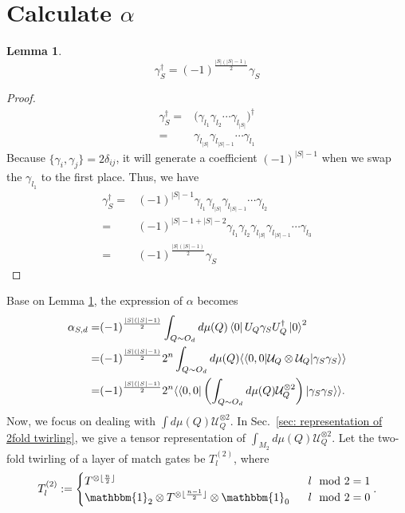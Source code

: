 \documentclass{article}
\newcommand{\pbra}[1]{\left( #1 \right)}
\newcommand{\supket}[1]{|#1 \rangle\rangle}
\newcommand{\supbra}[1]{\langle\langle #1 |}
\newtheorem{lemma}{Lemma}
\newcommand{\Ucal}{\mathcal{U}}
\newcommand{\id}{\mathbbm{1}}
\begin{document}
\section{Calculate $\alpha$}
\begin{lemma}
\label{lemma: gamma dagger}
    \begin{equation} 
        \gamma_S^\dagger = (-1)^{\frac{|S|(|S|-1)}{2}}\gamma_S
    \end{equation}
\end{lemma}
\begin{proof}
    \begin{align*}
        \gamma_S^\dagger =& \Big(
            \gamma_{l_1}\gamma_{l_2}\cdots \gamma_{l_{|S|}}
        \Big)^\dagger\\
        =& \gamma_{l_{|S|}}\gamma_{l_{|S|-1}}\cdots \gamma_{l_1}
    \end{align*}
    Because $\{\gamma_i, \gamma_j\} = 2\delta_{ij}$, it will generate a coefficient $(-1)^{|S|-1}$ when we swap the $\gamma_{l_1}$ to the first place. Thus, we have
    \begin{align*}
        \gamma_S^\dagger=& (-1)^{|S|-1}\gamma_{l_1}\gamma_{l_{|S|}}\gamma_{l_{|S|-1}}\cdots \gamma_{l_2}\\
        =& (-1)^{|S|-1 + |S|-2} \gamma_{l_1}\gamma_{l_2}\gamma_{l_{|S|}}\gamma_{l_{|S|-1}}\cdots \gamma_{l_3}\\
        =& (-1)^{\frac{|S|(|S|-1)}{2}}\gamma_S
    \end{align*}
    
\end{proof}

Base on Lemma \ref{lemma: gamma dagger}, the expression of $\alpha$ becomes
\begin{align*}
    \alpha_{S,d} =& (-1)^{\frac{|S|(|S|-1)}{2}} \int_{Q \sim O_d} d\mu(Q) 
    \bra{0}U_Q \gamma_SU_Q^\dagger\ket{0}^2\\
    =& (-1)^{\frac{|S|(|S|-1)}{2}} 2^n \int_{Q \sim O_d} d\mu(Q) 
    \supbra{0,0} \Ucal_Q\otimes\Ucal_Q \supket{\gamma_S\gamma_S} \\
    =& (-1)^{\frac{|S|(|S|-1)}{2}} 2^n  \supbra{0,0}  \pbra{\int_{Q \sim O_d}d\mu(Q)\Ucal_Q^{\otimes 2}} \supket{\gamma_S\gamma_S}.
\end{align*}
Now, we focus on dealing with $\int d\mu(Q)\Ucal_Q^{\otimes 2}$. In Sec.~\ref{sec: representation of 2fold twirling}, we give a tensor representation of $\int_{M_2} d\mu(Q)\Ucal_Q^{\otimes 2}$. Let the two-fold twirling of a layer of match gates be $T^{(2)}_l$, where
\begin{equation}
    T^{(2)}_l := \begin{cases}
        T^{\otimes \lfloor \frac{n}{2}\rfloor}   ~~& l \mod{2} = 1\\
        \id_2 \otimes T^{\otimes \lfloor \frac{n-1}{2}\rfloor}\otimes \id_0   ~~& l \mod{2}  = 0\\
    \end{cases}.
\end{equation}
\end{document}
